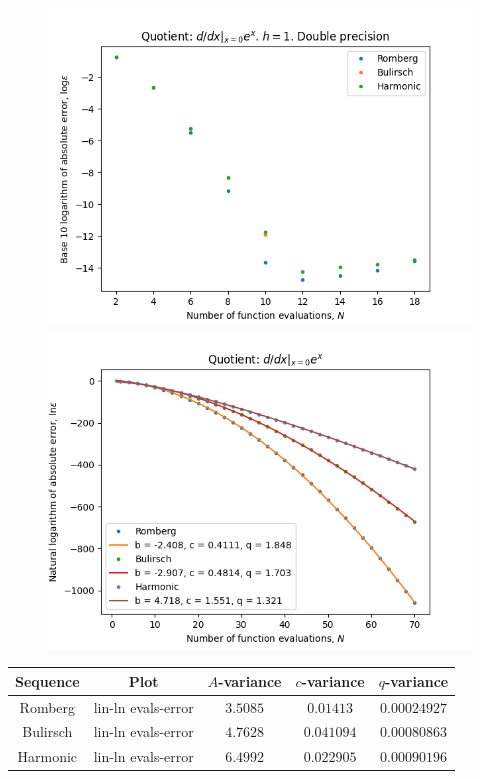 \begin{figure}[H]
\centering
\begin{minipage}{0.45\textwidth}
\centering
\includegraphics[scale=0.45]{diff_quot_plots/exp_0.png}
\end{minipage}
\begin{minipage}{0.45\textwidth}
\centering
\includegraphics[scale=0.45]{diff_quot_plots/exp_0_hp_trend.png}
\end{minipage}
\end{figure}

\begin{table}[H]
    \centering
    \begin{tabular}{c|c||c|c|c}
Sequence & Plot & \(A\)-variance & \(c\)-variance & \(q\)-variance\\\hline
Romberg & lin-ln evals-error & \(3.5085\) & \(0.01413\) & \(0.00024927\) \\
Bulirsch & lin-ln evals-error & \(4.7628\) & \(0.041094\) & \(0.00080863\) \\
Harmonic & lin-ln evals-error & \(6.4992\) & \(0.022905\) & \(0.00090196\) \\ 
    \end{tabular}
    \label{tab:my_label}
\end{table}

